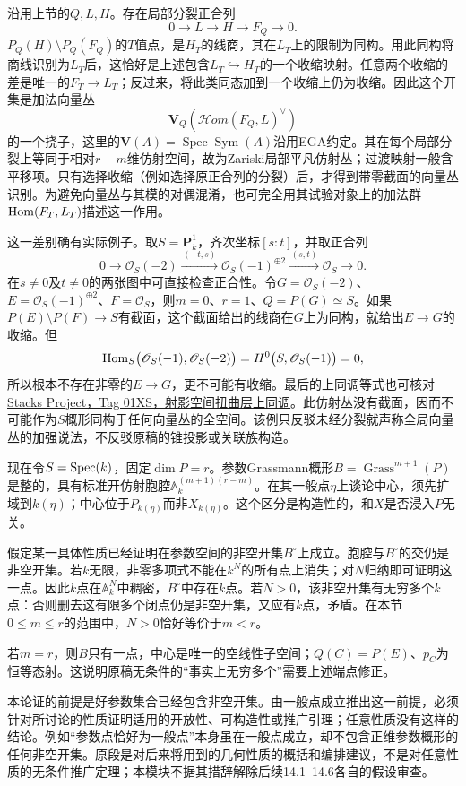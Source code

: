 沿用上节的$Q,L,H$。存在局部分裂正合列
\[
0\longrightarrow L\longrightarrow H\longrightarrow F_Q\longrightarrow0.
\]
$P_Q(H)\setminus P_Q(F_Q)$的$T$值点，是$H_T$的线商，其在$L_T$上的限制为同构。用此同构将商线识别为$L_T$后，这恰好是上述包含$L_T\hookrightarrow H_T$的一个收缩映射。任意两个收缩的差是唯一的$F_T\to L_T$；反过来，将此类同态加到一个收缩上仍为收缩。因此这个开集是加法向量丛
\[
\mathbf V_Q\!\left(
 \mathscr H\!om(F_Q,L)^\vee\right)
\]
的一个挠子，这里的$\mathbf V(A)=\operatorname{Spec}\operatorname{Sym}(A)$沿用EGA约定。其在每个局部分裂上等同于相对$r-m$维仿射空间，故为Zariski局部平凡仿射丛；过渡映射一般含平移项。只有选择收缩（例如选择原正合列的分裂）后，才得到带零截面的向量丛识别。为避免向量丛与其模的对偶混淆，也可完全用其试验对象上的加法群$\operatorname{Hom}(F_T,L_T)$描述这一作用。

这一差别确有实际例子。取$S=\mathbf P^1_k$，齐次坐标$[s:t]$，并取正合列
\[
0\longrightarrow\mathscr O_S(-2)
 \xrightarrow{\,(-t,s)\,}\mathscr O_S(-1)^{\oplus2}
 \xrightarrow{\,(s,t)\,}\mathscr O_S\longrightarrow0.
\]
在$s\ne0$及$t\ne0$的两张图中可直接检查正合性。令$G=\mathscr O_S(-2)$、$E=\mathscr O_S(-1)^{\oplus2}$、$F=\mathscr O_S$，则$m=0$、$r=1$、$Q=P(G)\simeq S$。如果$P(E)\setminus P(F)\to S$有截面，这个截面给出的线商在$G$上为同构，就给出$E\to G$的收缩。但
\[
\operatorname{Hom}_S\bigl(\mathscr O_S(-1),\mathscr O_S(-2)\bigr)
 =H^0\bigl(S,\mathscr O_S(-1)\bigr)=0,
\]
所以根本不存在非零的$E\to G$，更不可能有收缩。最后的上同调等式也可核对\href{https://stacks.math.columbia.edu/tag/01XS}{Stacks Project，Tag 01XS，射影空间扭曲层上同调}。此仿射丛没有截面，因而不可能作为$S$概形同构于任何向量丛的全空间。该例只反驳未经分裂就声称全局向量丛的加强说法，不反驳原稿的锥投影或关联族构造。

现在令$S=\operatorname{Spec}(k)$，固定$\dim P=r$。参数Grassmann概形$B=\operatorname{Grass}^{m+1}(P)$是整的，具有标准开仿射胞腔$\mathbb A_k^{(m+1)(r-m)}$。在其一般点$\eta$上谈论中心，须先扩域到$k(\eta)$；中心位于$P_{k(\eta)}$而非$X_{k(\eta)}$。这个区分是构造性的，和$X$是否浸入$P$无关。

假定某一具体性质已经证明在参数空间的非空开集$B^\circ$上成立。胞腔与$B^\circ$的交仍是非空开集。若$k$无限，非零多项式不能在$k^N$的所有点上消失；对$N$归纳即可证明这一点。因此$k$点在$\mathbb A_k^N$中稠密，$B^\circ$中存在$k$点。若$N>0$，该非空开集有无穷多个$k$点：否则删去这有限多个闭点仍是非空开集，又应有$k$点，矛盾。在本节$0\le m\le r$的范围中，$N>0$恰好等价于$m<r$。

若$m=r$，则$B$只有一点，中心是唯一的空线性子空间；$Q(C)=P(E)$、$p_C$为恒等态射。这说明原稿无条件的“事实上无穷多个”需要上述端点修正。

本论证的前提是好参数集合已经包含非空开集。由一般点成立推出这一前提，必须针对所讨论的性质证明适用的开放性、可构造性或推广引理；任意性质没有这样的结论。例如“参数点恰好为一般点”本身虽在一般点成立，却不包含正维参数概形的任何非空开集。原段是对后来将用到的几何性质的概括和编排建议，不是对任意性质的无条件推广定理；本模块不据其措辞解除后续14.1--14.6各自的假设审查。

